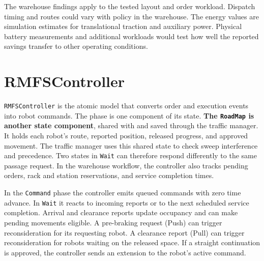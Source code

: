 \documentclass[11pt,a4paper]{article}
\begin{document}
The warehouse findings apply to the tested layout and order workload.
Dispatch timing and routes could vary with policy in the warehouse.
The energy values are simulation estimates for translational traction and
auxiliary power. Physical battery measurements and additional workloads
would test how well the reported savings transfer to other operating
conditions.

\clearpage
\appendix
{}
\section{RMFSController}
\label{app:rmfs-controller}
\texttt{RMFSController} is the atomic model that converts order and
execution events into robot commands. The phase is one component of
its state. \textbf{The \texttt{RoadMap} is another state component},
shared with and saved through the traffic manager. It holds each
robot's route, reported position, released progress, and
approved movement. The traffic manager uses this shared state to
check sweep interference and precedence. Two states in \texttt{Wait}
can therefore respond differently to the same passage request.
In the warehouse workflow,
the controller also tracks pending orders, rack and station
reservations, and service completion times.

In the \texttt{Command} phase the controller emits queued commands
with zero time advance. In \texttt{Wait} it reacts to incoming
reports or to the next scheduled service completion. Arrival and
clearance reports update occupancy and can make pending movements
eligible. A pre-braking request (Push) can trigger reconsideration
for its requesting robot. A clearance report (Pull) can trigger
reconsideration for robots waiting on the released space. If a
straight continuation is approved, the controller sends an
extension to the robot's active command.
\end{document}
